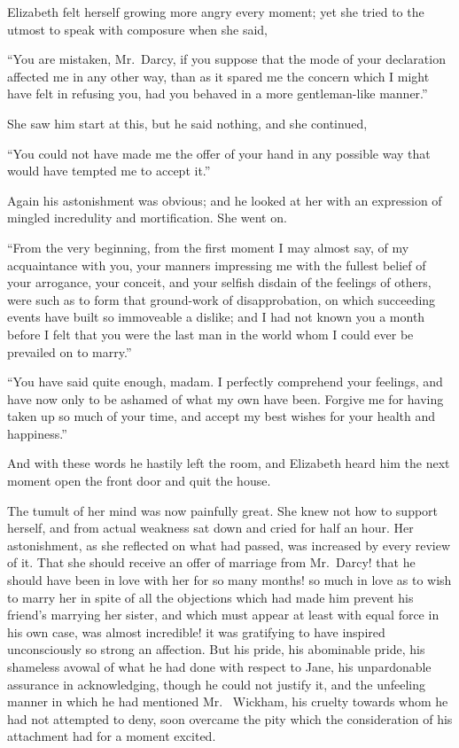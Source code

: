 Elizabeth felt herself growing more angry every moment;
yet she tried to the utmost to speak with composure when
she said,

“You are mistaken, Mr.\ Darcy, if you suppose that
the mode of your declaration affected me in any other
way, than as it spared me the concern which I might
have felt in refusing you, had you behaved in a more
gentleman-like manner.”

She saw him start at this, but he said nothing, and she
continued,

“You could not have made me the offer of your hand
in any possible way that would have tempted me to
accept it.”

Again his astonishment was obvious; and he looked
at her with an expression of mingled incredulity and
mortification. She went on.

“From the very beginning, from the first moment
I may almost say, of my acquaintance with you, your
manners impressing me with the fullest belief of your
arrogance, your conceit, and your selfish disdain of the
feelings of others, were such as to form that ground-work
of disapprobation, on which succeeding events have built
so immoveable a dislike; and I had not known you a
month before I felt that you were the last man in the
world whom I could ever be prevailed on to marry.”

“You have said quite enough, madam. I perfectly
comprehend your feelings, and have now only to be
ashamed of what my own have been. Forgive me for
having taken up so much of your time, and accept my
best wishes for your health and happiness.”

And with these words he hastily left the room, and
Elizabeth heard him the next moment open the front door
and quit the house.

The tumult of her mind was now painfully great. She
knew not how to support herself, and from actual weakness
sat down and cried for half an hour. Her astonishment,
as she reflected on what had passed, was increased by
every review of it. That she should receive an offer of
marriage from Mr.\ Darcy! that he should have been in
love with her for so many months! so much in love
as to wish to marry her in spite of all the objections which
had made him prevent his friend’s marrying her sister, and
which must appear at least with equal force in his own case,
was almost incredible! it was gratifying to have inspired
unconsciously so strong an affection. But his pride, his
abominable pride, his shameless avowal of what he had
done with respect to Jane, his unpardonable assurance
in acknowledging, though he could not justify it, and the
unfeeling manner in which he had mentioned Mr.\ %
Wickham, his cruelty towards whom he had not attempted to
deny, soon overcame the pity which the consideration of
his attachment had for a moment excited.


